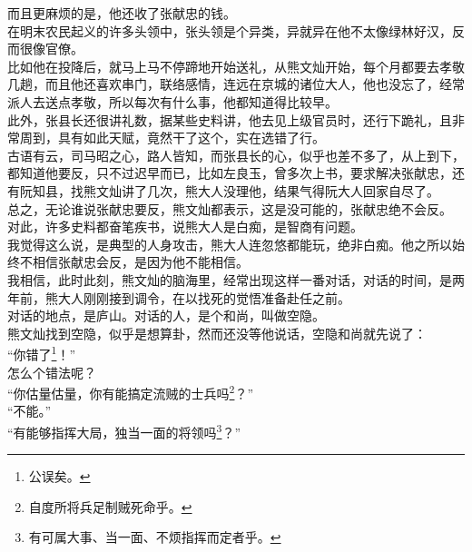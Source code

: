 \begin{multicols}{\theparacolNo}
而且更麻烦的是，他还收了张献忠的钱。\\

在明末农民起义的许多头领中，张头领是个异类，异就异在他不太像绿林好汉，反而很像官僚。\\

比如他在投降后，就马上马不停蹄地开始送礼，从熊文灿开始，每个月都要去孝敬几趟，而且他还喜欢串门，联络感情，连远在京城的诸位大人，他也没忘了，经常派人去送点孝敬，所以每次有什么事，他都知道得比较早。\\

此外，张县长还很讲礼数，据某些史料讲，他去见上级官员时，还行下跪礼，且非常周到，具有如此天赋，竟然干了这个，实在选错了行。\\

古语有云，司马昭之心，路人皆知，而张县长的心，似乎也差不多了，从上到下，都知道他要反，只不过迟早而已，比如左良玉，曾多次上书，要求解决张献忠，还有阮知县，找熊文灿讲了几次，熊大人没理他，结果气得阮大人回家自尽了。\\

总之，无论谁说张献忠要反，熊文灿都表示，这是没可能的，张献忠绝不会反。\\

对此，许多史料都奋笔疾书，说熊大人是白痴，是智商有问题。\\

我觉得这么说，是典型的人身攻击，熊大人连忽悠都能玩，绝非白痴。他之所以始终不相信张献忠会反，是因为他不能相信。\\

我相信，此时此刻，熊文灿的脑海里，经常出现这样一番对话，对话的时间，是两年前，熊大人刚刚接到调令，在以找死的觉悟准备赴任之前。\\

对话的地点，是庐山。对话的人，是个和尚，叫做空隐。\\

熊文灿找到空隐，似乎是想算卦，然而还没等他说话，空隐和尚就先说了：\\

“你错了\footnote{公误矣。}！”\\

怎么个错法呢？\\

“你估量估量，你有能搞定流贼的士兵吗\footnote{自度所将兵足制贼死命乎。}？”\\

“不能。”\\

“有能够指挥大局，独当一面的将领吗\footnote{有可属大事、当一面、不烦指挥而定者乎。}？”\\


\end{multicols}
